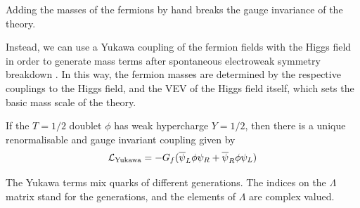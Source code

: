 Adding the masses of the fermions by hand breaks the gauge invariance of the theory.

Instead, we can use a Yukawa coupling of the fermion fields with the Higgs field in order to generate mass terms after spontaneous electroweak symmetry breakdown \cite{Weinberg:1967tq}.
In this way, the fermion masses are determined by the respective couplings to the Higgs field, and the VEV of the Higgs field itself, which sets the basic mass scale of the theory.

If the $T = 1/2$ doublet $\phi$ has weak hypercharge $Y = 1/2$, then there is a unique renormalisable and gauge invariant coupling given by
%
\begin{equation}\label{eq:yukawa_coupling}
  \mathcal{L}_{\textnormal{Yukawa}} = 
  - G_f (\overline{\psi}_L \phi \psi_R + \overline{\psi}_R \phi \psi_L)
\end{equation}
%


The Yukawa terms mix quarks of different generations. The indices on the $\Lambda$ matrix stand for the generations, and the elements of $\Lambda$ are complex valued.


